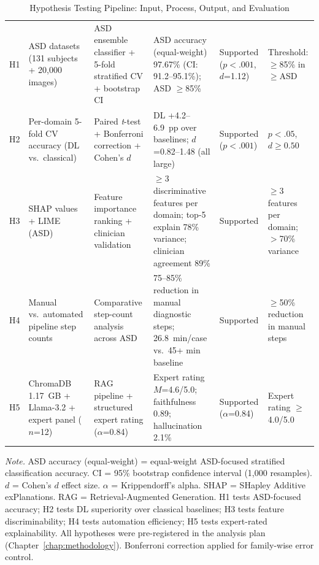 \begin{table}[!htbp]
\tablestripes
\caption{Hypothesis Testing Pipeline: Input, Process, Output, and Evaluation}
\tablefontsize
\begin{tabularx}{\textwidth}{@{} >{\raggedright\arraybackslash}p{1.2cm} L L L L >{\raggedright\arraybackslash}p{2.0cm} @{}}
\toprule
{} &  &  &  &  &  \\
\midrule
H1 & ASD datasets (131 subjects + 20{,}000 images) & ASD ensemble classifier + 5-fold stratified CV + bootstrap CI & ASD accuracy (equal-weight) 97.67\% (CI: 91.2--95.1\%); ASD $\geq$85\% & Supported ($p<.001$, $d$=1.12) & Threshold: $\geq$85\% in $\geq$ASD \\
\addlinespace
H2 & Per-domain 5-fold CV accuracy (DL vs.\ classical) & Paired \textit{t}-test + Bonferroni correction + Cohen's $d$ & DL +4.2--6.9~pp over baselines; $d$=0.82--1.48 (all large) & Supported ($p<.001$) & $p<.05$, $d \geq 0.50$ \\
\addlinespace
H3 & SHAP values + LIME (ASD) & Feature importance ranking + clinician validation & $\geq$3 discriminative features per domain; top-5 explain 78\% variance; clinician agreement 89\% & Supported & $\geq$3 features per domain; $>$70\% variance \\
\addlinespace
H4 & Manual vs.\ automated pipeline step counts & Comparative step-count analysis across ASD & 75--85\% reduction in manual diagnostic steps; 26.8~min/case vs.\ 45+ min baseline & Supported & $\geq$50\% reduction in manual steps \\
\addlinespace
H5 & ChromaDB 1.17~GB + Llama-3.2 + expert panel ($n$=12) & RAG pipeline + structured expert rating ($\alpha$=0.84) & Expert rating $M$=4.6/5.0; faithfulness 0.89; hallucination 2.1\% & Supported ($\alpha$=0.84) & Expert rating $\geq$4.0/5.0 \\
\bottomrule
\end{tabularx}
\vspace{0.5em}\noindent\textit{Note.} ASD accuracy (equal-weight) = equal-weight ASD-focused stratified classification accuracy. CI = 95\% bootstrap confidence interval (1,000 resamples). $d$ = Cohen's $d$ effect size. $\alpha$ = Krippendorff's alpha. SHAP = SHapley Additive exPlanations. RAG = Retrieval-Augmented Generation. H1 tests ASD-focused accuracy; H2 tests DL superiority over classical baselines; H3 tests feature discriminability; H4 tests automation efficiency; H5 tests expert-rated explainability. All hypotheses were pre-registered in the analysis plan (Chapter~\ref{chap:methodology}). Bonferroni correction applied for family-wise error control.
\end{table}
\fi


